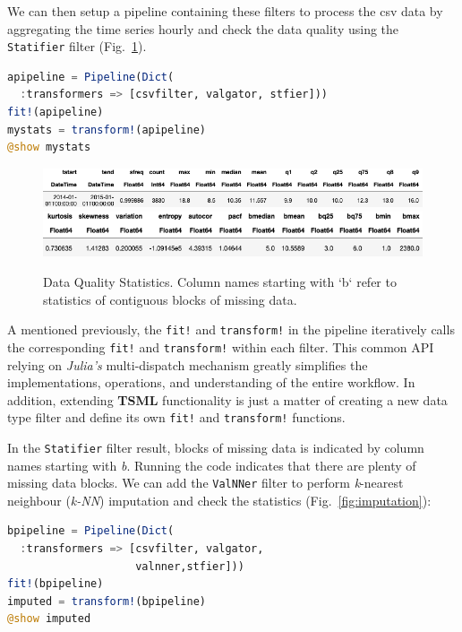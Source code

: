 \documentclass{juliacon}
\begin{document}
We can then setup a pipeline containing these filters to process the csv data
by aggregating the time series hourly and check the data quality using the
\texttt{Statifier} filter (Fig.~\ref{fig:dataquality}).

\begin{lstlisting}[language = Julia]
apipeline = Pipeline(Dict(
  :transformers => [csvfilter, valgator, stfier]))
fit!(apipeline)
mystats = transform!(apipeline)
@show mystats 
\end{lstlisting}

\begin{figure}[htbp]
   \centering
   \includegraphics[width=\columnwidth]{stat1.png} %
   \vskip 2pt
      \includegraphics[width=\columnwidth]{stat2.png} %
   \caption{Data Quality Statistics. Column names starting with `b` refer to statistics of contiguous blocks of missing data.}
   \label{fig:dataquality}
\end{figure}

A mentioned previously, the \texttt{fit!} and \texttt{transform!} in the pipeline
iteratively calls the corresponding \texttt{fit!} and \texttt{transform!} within each filter. 
This common API relying on \emph{Julia's} multi-dispatch mechanism greatly simplifies the implementations, operations, 
and understanding of the entire workflow. In addition, extending \textbf{TSML} functionality is just a 
matter of creating a new data type filter and define its own  \texttt{fit!} and \texttt{transform!} 
functions.

\vskip 6pt

In the \texttt{Statifier} filter result, blocks of missing data is indicated by column names starting
with \emph{b}. Running the code indicates that there are plenty of missing data blocks.
We can add the \texttt{ValNNer} filter to perform \emph{k}-nearest neighbour (\emph{k-NN}) imputation and check
the statistics (Fig.~\ref{fig:imputation}):

\begin{lstlisting}[language = Julia]
bpipeline = Pipeline(Dict(
  :transformers => [csvfilter, valgator, 
                    valnner,stfier]))
fit!(bpipeline)
imputed = transform!(bpipeline)
@show imputed
\end{lstlisting}
\end{document}
